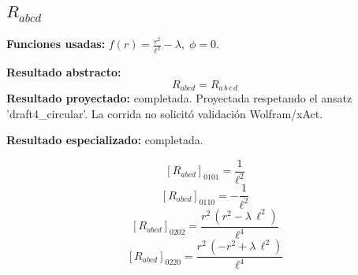 \documentclass[11pt]{article}
\begin{document}
\subsection*{$ R_{abcd} $}
\textbf{Funciones usadas:} $ f\!\left(r\right) = \frac{{r}^{2}}{{\ell}^{2}} - \lambda,\;\phi=0 $.\par
\textbf{Resultado abstracto:}
\begin{dmath*}[breakdepth={5}]
R_{abcd} = R{}_{a\,b\,c\,d}
\end{dmath*}
\textbf{Resultado proyectado:} completada. Proyectada respetando el ansatz 'draft4\_circular'. La corrida no solicitó validación Wolfram/xAct.\par
\textbf{Resultado especializado:} completada.\par
\begin{dmath*}[breakdepth={5}]
\left[R_{abcd}\right]_{0101} = \frac{1}{{\ell}^{2}}
\end{dmath*}
\begin{dmath*}[breakdepth={5}]
\left[R_{abcd}\right]_{0110} = -\frac{1}{{\ell}^{2}}
\end{dmath*}
\begin{dmath*}[breakdepth={5}]
\left[R_{abcd}\right]_{0202} = \frac{{r}^{2}\,\left({r}^{2} - \lambda\,{\ell}^{2}\right)}{{\ell}^{4}}
\end{dmath*}
\begin{dmath*}[breakdepth={5}]
\left[R_{abcd}\right]_{0220} = \frac{{r}^{2}\,\left(-{r}^{2} + \lambda\,{\ell}^{2}\right)}{{\ell}^{4}}
\end{dmath*}
\end{document}
